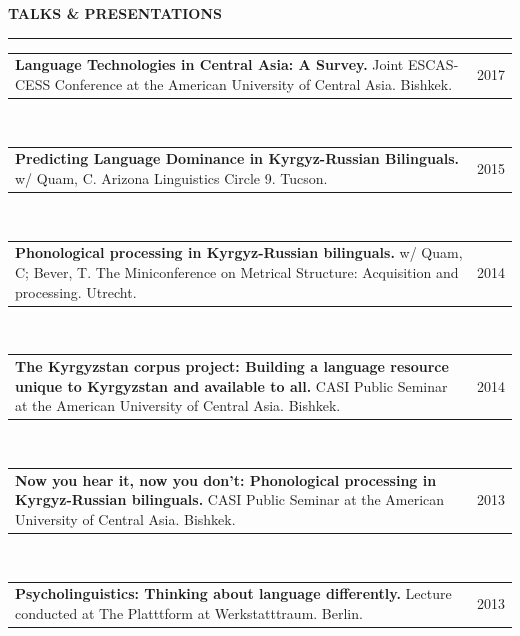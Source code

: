 \documentclass{resume} %
\begin{document}
\begin{minipage}{\textwidth}

\sectionskip
\MakeUppercase{\textbf{Talks \& Presentations}}
  \sectionlineskip
  \hrule
\vspace{.5cm}

\begin{tabular}{@{}p{}p{}@{}}
  {\bf Language Technologies in Central Asia: A Survey.} {Joint ESCAS-CESS Conference at the American University of Central Asia. Bishkek.}
  &
\hfill  {2017}
\end{tabular}
\\

\begin{tabular}{@{}p{}p{}@{}}
  {\bf Predicting Language Dominance in Kyrgyz-Russian Bilinguals.} {w/ Quam, C.} {Arizona Linguistics Circle 9. Tucson.}
  &
\hfill  {2015}
\end{tabular}
\\

\begin{tabular}{@{}p{}p{}@{}}
  {\bf Phonological processing in Kyrgyz-Russian bilinguals.} {w/ Quam, C; Bever, T.} {The Miniconference on Metrical Structure: Acquisition and processing. Utrecht.}
  &
\hfill  {2014}
\end{tabular}
\\

\begin{tabular}{@{}p{}p{}@{}}
  {\bf The Kyrgyzstan corpus project: Building a language resource unique to Kyrgyzstan and available to all.} {CASI Public Seminar at the American University of Central Asia. Bishkek.}
  &
\hfill  {2014}
\end{tabular}
\\

\begin{tabular}{@{}p{}p{}@{}}
  {\bf Now you hear it, now you don’t: Phonological processing in Kyrgyz-Russian bilinguals.} {CASI Public Seminar at the American University of Central Asia. Bishkek.}
  &
  \hfill {2013}
\end{tabular}
\\

\begin{tabular}{@{}p{}p{}@{}}
  {\bf Psycholinguistics: Thinking about language differently.} {Lecture conducted at The Platttform at Werkstatttraum. Berlin.}
  &
\hfill  {2013}
\end{tabular}


\end{minipage}
\end{document}
